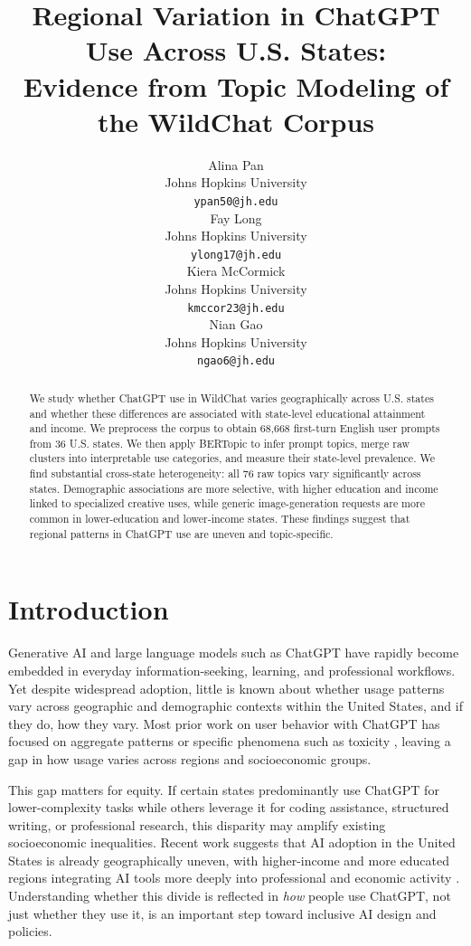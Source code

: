 \documentclass[11pt]{article}
\title{Regional Variation in ChatGPT Use Across U.S. States: \\
Evidence from Topic Modeling of the WildChat Corpus}
\author{Alina Pan \\
  Johns Hopkins University \\
  \texttt{ypan50@jh.edu} \\\And
  Fay Long \\
  Johns Hopkins University \\
  \texttt{ylong17@jh.edu} \\\AND
  Kiera McCormick \\
  Johns Hopkins University \\
  \texttt{kmccor23@jh.edu} \\\And
  Nian Gao \\
  Johns Hopkins University \\
  \texttt{ngao6@jh.edu} \\}
\begin{document}
\maketitle

\begin{abstract}
We study whether ChatGPT use in WildChat varies geographically across U.S. states and whether these differences are associated with state-level educational attainment and income. We preprocess the corpus to obtain 68,668 first-turn English user prompts from 36 U.S. states. We then apply BERTopic to infer prompt topics, merge raw clusters into interpretable use categories, and measure their state-level prevalence. We find substantial cross-state heterogeneity: all 76 raw topics vary significantly across states. Demographic associations are more selective, with higher education and income linked to specialized creative uses, while generic image-generation requests are more common in lower-education and lower-income states. These findings suggest that regional patterns in ChatGPT use are uneven and topic-specific.
\end{abstract}

\section{Introduction}

Generative AI and large language models such as ChatGPT have rapidly become embedded in everyday information-seeking, learning, and professional workflows. Yet despite widespread adoption, little is known about whether usage patterns vary across geographic and demographic contexts within the United States, and if they do, how they vary. Most prior work on user behavior with ChatGPT has focused on aggregate patterns or specific phenomena such as toxicity \citep{zhao2024wildchat}, leaving a gap in how usage varies across regions and socioeconomic groups.

This gap matters for equity. If certain states predominantly use ChatGPT for lower-complexity tasks while others leverage it for coding assistance, structured writing, or professional research, this disparity may amplify existing socioeconomic inequalities. Recent work suggests that AI adoption in the United States is already geographically uneven, with higher-income and more educated regions integrating AI tools more deeply into professional and economic activity \citep{daepp2024emerging}. Understanding whether this divide is reflected in \emph{how} people use ChatGPT, not just whether they use it, is an important step toward inclusive AI design and policies.
\end{document}
